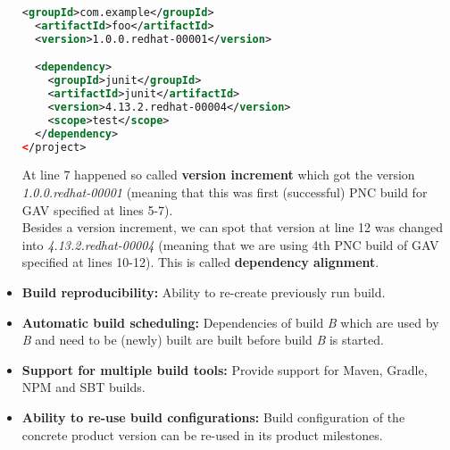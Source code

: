 \documentclass[../main.tex]{subfiles}
\begin{document}
\begin{itemize}
\begin{lstlisting}[language=XML, caption=Same pom.xml after alignment operation]
  <groupId>com.example</groupId>
  <artifactId>foo</artifactId>
  <version>1.0.0.redhat-00001</version>

  <dependency>
    <groupId>junit</groupId>
    <artifactId>junit</artifactId>
    <version>4.13.2.redhat-00004</version>
    <scope>test</scope>
  </dependency>
</project>
\end{lstlisting}

  At line 7 happened so called \textbf{version increment} which got the version \textit{1.0.0.redhat-00001} (meaning that this was first (successful) PNC build for GAV specified at lines 5-7).\\
  Besides a version increment, we can spot that version at line 12 was changed into \textit{4.13.2.redhat-00004} (meaning that we are using 4th PNC build of GAV specified at lines 10-12). This is called \textbf{dependency alignment}.

  \item \textbf{Build reproducibility:} Ability to re-create previously run build.

  \item \textbf{Automatic build scheduling:} Dependencies of build \textit{B} which are used by \textit{B} and need to be (newly) built are built before build \textit{B} is started.

  \item \textbf{Support for multiple build tools:} Provide support for Maven, Gradle, NPM and SBT builds.

  \item \textbf{Ability to re-use build configurations:} Build configuration of the concrete product version can be re-used in its product milestones.

\end{itemize}
\end{document}

